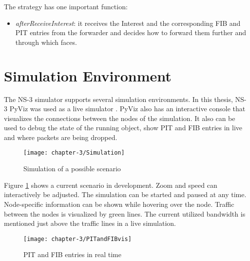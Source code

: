 The strategy has one important function:

\begin{itemize}
\item \emph{afterReceiveInterest}: it receives the Interest and the corresponding FIB and PIT entries from the forwarder and decides how to forward them further and through which faces.
\end{itemize}


\section{Simulation Environment}

The NS-3 simulator supports several simulation environments. In this thesis, NS-3 PyViz was used as a live simulator \cite{pyviz}. PyViz also has an interactive console that visualizes the connections between the nodes of the simulation. It also can be used to debug the state of the running object, show PIT and FIB entries in live and where packets are being dropped.

\vspace{5mm} %

\begin{figure}[H]
  \centering
  \texttt{[image: chapter-3/Simulation]}
  \caption{Simulation of a possible scenario}
  \label{fig:Simulation}
\end{figure}

\vspace{5mm} %

Figure \ref{fig:Simulation} shows a current scenario in development. Zoom and speed can interactively be adjusted. The simulation can be started and paused at any time. Node-specific information can be shown while hovering over the node. Traffic between the nodes is visualized by green lines. The current utilized bandwidth is mentioned just above the traffic lines in a live simulation.

\clearpage

\vspace{5mm} %

\begin{figure}[H]
  \centering
  \texttt{[image: chapter-3/PITandFIBvis]}
  \caption{PIT and FIB entries in real time}
  \label{fig:PITandFIBvis}
\end{figure}

\vspace{5mm} %

